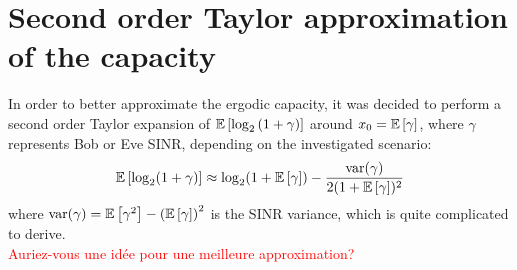 \documentclass[12pt]{article}
\begin{document}
\section{Second order Taylor approximation of the capacity}
In order to better approximate the ergodic capacity, it was decided to  perform a second order Taylor expansion of $\mathbb{E} \left[\log_2{(1+\gamma)}\right]$ around $x_0 = \mathbb{E} \left[\gamma\right]$, where $\gamma$ represents Bob or Eve SINR, depending on the investigated scenario:
\begin{equation}
	\mathbb{E} \left[\log_2(1+\gamma)\right] \approx \log_2(1+\mathbb{E} \left[\gamma\right]) - \frac{\text{var}(\gamma)}{2(1+\mathbb{E} \left[\gamma\right])^2}
	\label{eq:second_order_approx}
\end{equation}
where $\text{var}(\gamma) = \mathbb{E} \left[\gamma^2\right] - \left(\mathbb{E} \left[\gamma\right]\right)^2$ is the SINR variance, which is quite complicated to derive.\\
\textcolor{red}{Auriez-vous une idée pour une meilleure approximation?}
\end{document}
